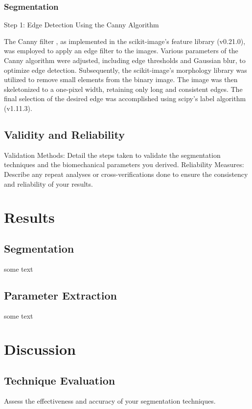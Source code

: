 \documentclass{micro-econ-thesis}
\begin{document}
\subsubsection{Segmentation}
Step 1: Edge Detection Using the Canny Algorithm

The Canny filter \parencite{canny_computational_1986}, as implemented in the scikit-image's feature library (v0.21.0), was employed to apply an edge filter to the images. Various parameters of the Canny algorithm were adjusted, including edge thresholds and Gaussian blur, to optimize edge detection. Subsequently, the scikit-image's morphology library was utilized to remove small elements from the binary image. The image was then skeletonized to a one-pixel width, retaining only long and consistent edges. The final selection of the desired edge was accomplished using scipy's label algorithm (v1.11.3).

\subsection{Validity and Reliability}
Validation Methods: Detail the steps taken to validate the segmentation techniques and the biomechanical parameters you derived.
Reliability Measures: Describe any repeat analyses or cross-verifications done to ensure the consistency and reliability of your results.

\section{Results}
\label{sec:yetanother}

\subsection{Segmentation}
\label{subsec:last}
some text 

\subsection{Parameter Extraction}
some text 

\section{Discussion}
\subsection{Technique Evaluation}
Assess the effectiveness and accuracy of your segmentation techniques. 
\end{document}
